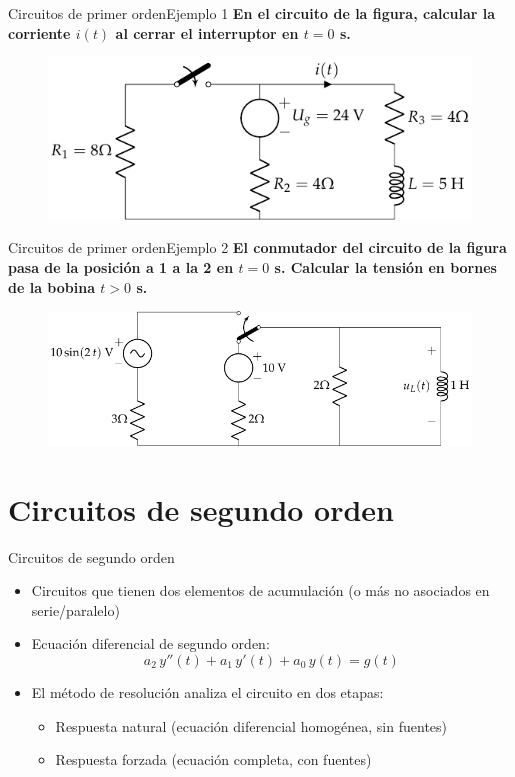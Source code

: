 \documentclass[aspectratio=169, xcolor={usenames,svgnames,dvipsnames}]{beamer}
\begin{document}
\begin{frame}{Circuitos de primer orden}{Ejemplo 1}
    \textbf{En el circuito de la figura, calcular la corriente $i(t)$ al cerrar el interruptor en $t = 0$ s.}
	    \begin{figure}[H]
	        \centering
	        \includegraphics{../figs/ej_transitorio_1orden.pdf}
	    \end{figure}
\end{frame}

\begin{frame}{Circuitos de primer orden}{Ejemplo 2}
    \textbf{El conmutador del circuito de la figura pasa de la posición a 1 a la 2 en $t = 0$ s. Calcular la tensión en bornes de la bobina $t > 0$ s.}
	
	\begin{figure}[H]
	    \centering
	    \includegraphics{../figs/ej_transitorio_1orden_AC.pdf}
	\end{figure}
\end{frame}


\section{Circuitos de segundo orden}

\begin{frame}{Circuitos de segundo orden}
\begin{itemize}
\item Circuitos que tienen \alert{dos elementos de acumulación} (o más no asociados en serie/paralelo)
\item \alert{Ecuación diferencial de segundo orden}: 
\begin{equation*}
	    a_2\,y''(t)+a_1\,y'(t)+a_0\,y(t)=g(t)
	\end{equation*}
	\item El método de resolución analiza el circuito en dos etapas:
\begin{itemize}
\item \alert{Respuesta natural} (ecuación diferencial homogénea, sin fuentes) 
\item \alert{Respuesta forzada} (ecuación completa, con fuentes)
\end{itemize}
\end{itemize}
\end{frame}
\end{document}
